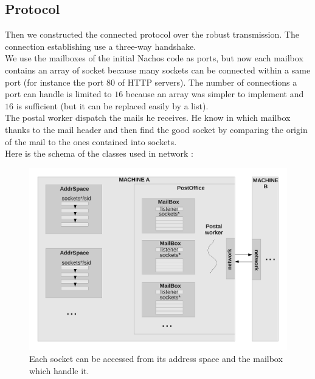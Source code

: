 \subsection{Protocol}
Then we constructed the connected protocol over the robust transmission.
The connection establishing use a three-way handshake.\\
We use the mailboxes of the initial Nachos code as ports, but now each mailbox contains an array of 
socket because many sockets can be connected within a same port (for instance the
port $80$ of HTTP servers).  The number of connections a port can handle is limited 
to $16$ because an array was simpler to implement and $16$ is sufficient (but it 
can be replaced easily by a list).\\
The postal worker dispatch the mails he receives. He know in which mailbox
thanks to the mail header and then find the good socket by comparing the origin
of the mail to the ones contained into sockets.\\
Here is the schema of the classes used in network :
\begin{figure}[H]
	\centering
		\includegraphics[scale=0.4]{networkschema}
		\caption{Each socket can be accessed from its address space and the mailbox which handle it.}
\end{figure}
